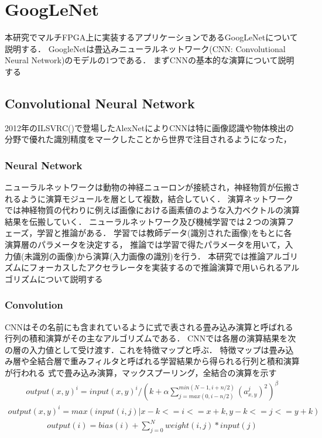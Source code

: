 \chapter{GoogLeNet}
{
\label{chap:googlenet}
本研究でマルチFPGA上に実装するアプリケーションであるGoogLeNetについて説明する．
GoogleNetは畳込みニューラルネットワーク(CNN: Convolutional Neural Network)のモデルの1つである．
まずCNNの基本的な演算について説明する
\section{Convolutional Neural Network}
\label{sec:cnn}
2012年のILSVRC()で登場したAlexNetによりCNNは特に画像認識や物体検出の分野で優れた識別精度をマークしたことから世界で注目されるようになった，
\subsection{Neural Network}
\label{sec:nn}
ニューラルネットワークは動物の神経ニューロンが接続され，神経物質が伝搬されるように演算モジュールを層として複数，結合していく．
演算ネットワークでは神経物質の代わりに例えば画像における画素値のような入力ベクトルの演算結果を伝搬していく．
ニューラルネットワーク及び機械学習では２つの演算フェーズ，学習と推論がある．
学習では教師データ(識別された画像)をもとに各演算層のパラメータを決定する，
推論では学習で得たパラメータを用いて，入力値(未識別の画像)から演算(入力画像の識別)を行う．
本研究では推論アルゴリズムにフォーカスしたアクセラレータを実装するので推論演算で用いられるアルゴリズムについて説明する
\subsection{Convolution}
\label{sec:conv}
CNNはその名前にも含まれているように式で表される畳み込み演算と呼ばれる行列の積和演算がその主なアルゴリズムである．
CNNでは各層の演算結果を次の層の入力値として受け渡す．これを特徴マップと呼ぶ．
特徴マップは畳み込み層や全結合層で重みフィルタと呼ばれる学習結果から得られる行列と積和演算が行われる
式で畳み込み演算，マックスプーリング，全結合の演算を示す
\begin{eqnarray}
	output(x, y)^{i} = input(x, y)^{i} / (k + \alpha \sum_{j=max(0, i-n/2)}^{min(N-1, i+n/2)} (a^j_{x, y})^2)^\beta
\end{eqnarray}
\begin{eqnarray}
	output(x, y)^{i} = max(input(i, j) | x-k <= i <= x+k, y-k <= j <= y+k)
\end{eqnarray}
\begin{eqnarray}
  output(i) = bias(i) + \sum_{j=0}^{N} weight(i, j) * input(j)
\end{eqnarray}

}
